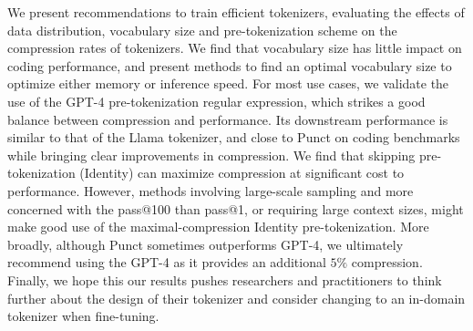 We present recommendations to train efficient tokenizers, evaluating the effects of data distribution, vocabulary size and pre-tokenization scheme on the compression rates of tokenizers. We find that vocabulary size has little impact on coding performance, and present methods to find an optimal vocabulary size to optimize either memory or inference speed. For most use cases, we validate the use of the GPT-4 pre-tokenization regular expression, which strikes a good balance between compression and performance. Its downstream performance is similar to that of the Llama tokenizer, and close to Punct on coding benchmarks while bringing clear improvements in compression. We find that skipping pre-tokenization (Identity) can maximize compression at significant cost to performance. However, methods involving large-scale sampling and more concerned with the pass@100 than pass@1, or requiring large context sizes, might make good use of the maximal-compression Identity pre-tokenization. More broadly, although Punct sometimes outperforms GPT-4, we ultimately recommend using the GPT-4 as it provides an additional $5\%$ compression. Finally, we hope this our results pushes researchers and practitioners to think further about the design of their tokenizer and consider changing to an in-domain tokenizer when fine-tuning. 



